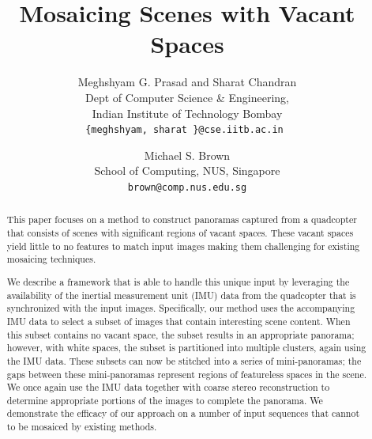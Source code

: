 \documentclass[10pt,twocolumn,letterpaper]{article}
\begin{document}
\title{Mosaicing Scenes with Vacant Spaces}

\author{Meghshyam G. Prasad and Sharat Chandran\\
Dept of Computer Science \& Engineering, \\
Indian Institute of Technology Bombay\\
{\tt\small \{meghshyam, sharat \}@cse.iitb.ac.in }
\and
Michael S. Brown\\
School of Computing, NUS, Singapore\\
{\tt\small brown@comp.nus.edu.sg}
}

\maketitle


\begin{abstract}
  This paper focuses on a method to construct panoramas captured from
  a quadcopter that consists of scenes with significant regions of
  vacant spaces.  These vacant spaces yield little to no features to
  match input images making them challenging for existing
  mosaicing techniques.  

  We describe a framework that is able to handle this unique input by
  leveraging the availability of the inertial measurement unit (IMU)
  data from the quadcopter that is synchronized with the input images.
  Specifically, our method uses the accompanying IMU data to select a
  subset of images that contain interesting scene content. When this
  subset contains no vacant space, the subset results in an
  appropriate panorama; however, with white spaces, the subset is
  partitioned into multiple clusters, again using the IMU data.  These
  subsets can now be stitched into a series of mini-panoramas; the
  gaps between these mini-panoramas represent regions of featureless
  spaces in the scene.  We once again use the IMU data together with
  coarse stereo reconstruction to determine appropriate portions of
  the images to complete the panorama. We demonstrate the efficacy of
  our approach on a number of input sequences that cannot to be
  mosaiced by existing methods.
\end{abstract}
\end{document}
